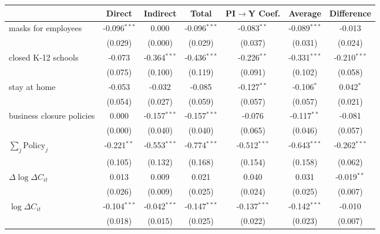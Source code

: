 
\begin{tabular}{lccccc|>{}c}
\toprule
  & Direct & Indirect & Total & PI$\to$Y Coef. & Average & Difference\\
\midrule
masks for employees & -0.096$^{***}$ & 0.000 & -0.096$^{***}$ & -0.083$^{**}$ & -0.089$^{***}$ & -0.013\\
 & (0.029) & (0.000) & (0.029) & (0.037) & (0.031) & (0.024)\\
closed K-12 schools & -0.073 & -0.364$^{***}$ & -0.436$^{***}$ & -0.226$^{**}$ & -0.331$^{***}$ & -0.210$^{***}$\\
 & (0.075) & (0.100) & (0.119) & (0.091) & (0.102) & (0.058)\\
stay at home & -0.053 & -0.032 & -0.085 & -0.127$^{**}$ & -0.106$^{*}$ & 0.042$^{*}$\\
 & (0.054) & (0.027) & (0.059) & (0.057) & (0.057) & (0.021)\\
business closure policies & 0.000 & -0.157$^{***}$ & -0.157$^{***}$ & -0.076 & -0.117$^{**}$ & -0.081\\
 & (0.000) & (0.040) & (0.040) & (0.065) & (0.046) & (0.057)\\
$\sum_j \mathrm{Policy}_j$ & -0.221$^{**}$ & -0.553$^{***}$ & -0.774$^{***}$ & -0.512$^{***}$ & -0.643$^{***}$ & -0.262$^{***}$\\
 & (0.105) & (0.132) & (0.168) & (0.154) & (0.158) & (0.062)\\
$\Delta \log \Delta C_{it}$ & 0.013 & 0.009 & 0.021 & 0.040 & 0.031 & -0.019$^{**}$\\
 & (0.026) & (0.009) & (0.025) & (0.024) & (0.025) & (0.007)\\
$\log \Delta C_{it}$ & -0.104$^{***}$ & -0.042$^{***}$ & -0.147$^{***}$ & -0.137$^{***}$ & -0.142$^{***}$ & -0.010\\
 & (0.018) & (0.015) & (0.025) & (0.022) & (0.023) & (0.007)\\
\bottomrule
\end{tabular}